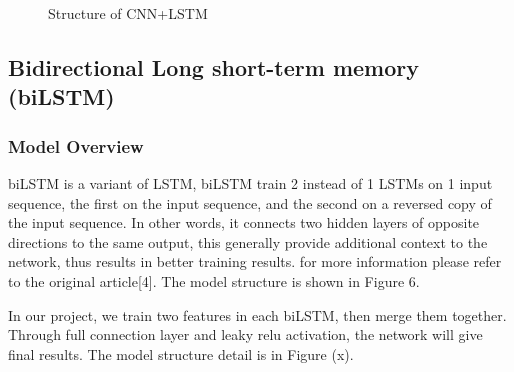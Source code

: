 \documentclass{article}
\begin{document}
\begin{figure}[h]
	\centering
	\caption{Structure of CNN+LSTM}
\end{figure} 

\subsection{Bidirectional Long short-term memory (biLSTM)}
\subsubsection{Model Overview}
biLSTM is a variant of LSTM, biLSTM train 2 instead of 1 LSTMs on 1 input sequence, the first on the input sequence, and the second on a reversed copy of the input sequence. In other words, it connects two hidden layers of opposite directions to the same output, this generally provide additional context to the network, thus results in better training results. for more information please refer to the original article[4]. The model structure is shown in Figure 6.


In our project, we train two features in each biLSTM, then merge them together. Through full connection layer and leaky relu activation, the network will give final results. The model structure detail is in Figure (x).
\end{document}
